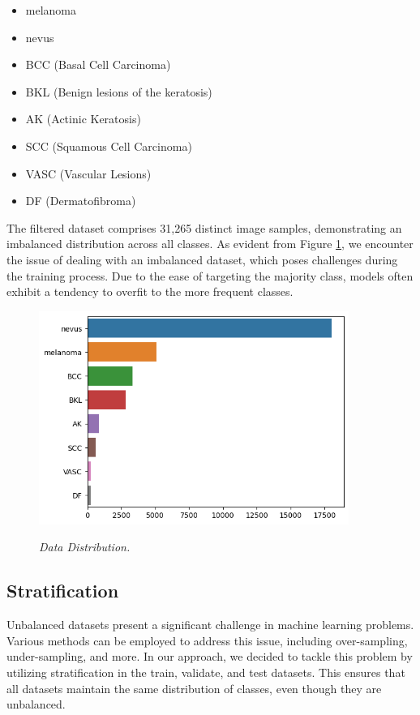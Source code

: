 \begin{itemize}
  \item melanoma
  \item nevus
  \item BCC (Basal Cell Carcinoma)
  \item BKL (Benign lesions of the keratosis)
  \item AK (Actinic Keratosis)
  \item SCC (Squamous Cell Carcinoma)
  \item VASC (Vascular Lesions)
  \item DF (Dermatofibroma)
\end{itemize}

The filtered dataset comprises 31,265 distinct image samples, demonstrating an
imbalanced distribution across all classes. As evident from Figure
\ref{fig:hole-dataset-distribution}, we encounter the issue of dealing with an
imbalanced dataset, which poses challenges during the training process. Due to
the ease of targeting the majority class, models often exhibit a tendency to
overfit to the more frequent classes.

\begin{figure}[H]
  \centering
  \includegraphics[width=0.9\textwidth]{imatges/methodological_contribution/hole-dataset-diagnosis.png}
  \caption[Data Distribution]{\textit{Data Distribution. }}
  {\label{fig:hole-dataset-distribution}}
\end{figure}

\subsection{Stratification}

Unbalanced datasets present a significant challenge in machine learning
problems. Various methods can be employed to address this issue, including
over-sampling, under-sampling, and more. In our approach, we decided to tackle
this problem by utilizing stratification in the train, validate, and test
datasets. This ensures that all datasets maintain the same distribution of
classes, even though they are unbalanced. \\

